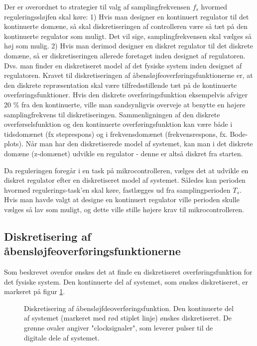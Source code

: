 Der er overordnet to strategier til valg af samplingfrekvensen \(f_s\) hvormed
reguleringssløjfen skal køre:
1) Hvis man designer en kontinuert regulator til det kontinuerte domæne, så
skal diskretiseringen af controlleren være så tæt på den kontinuerte regulator som muligt.
Det vil sige, samplingfrekvensen skal vælges så høj som mulig.
2) Hvis man derimod designer en diskret regulator til det diskrete domæne,
så er diskretiseringen allerede foretaget inden designet af regulatoren.
Dvs. man finder en diskretiseret model af det fysiske system inden designet af regulatoren.
Kravet til diskretiseringen af åbensløjfeoverføringsfunktionerne er, at den diskrete repræsentation
skal være tilfredsstillende tæt på de kontinuerte overføringsfunktioner.
Hvis den diskrete overføringsfunktion eksempelvis afviger 20 \% fra den kontinuerte, ville man
sandsynligvis overveje at benytte en højere samplingfrekvens til diskretiseringen.
Sammenligningen af den diskrete overførselsfunktion og den kontinuerte overføringsfunktion
kan være både i tidsdomænet (fx steprespons) og i frekvensdomænet (frekvensrespons, fx. Bode-plots).
Når man har den diskretiserede model af systemet, kan man i det diskrete domæne (z-domænet)
udvikle en regulator - denne er altså diskret fra starten.

Da reguleringen foregår i en task på mikrocontrolleren, vælges det
at udvikle en diskret regulator efter en diskretiseret model af systemet.
Således kan perioden hvormed regulerings-task'en skal køre, fastlægges ud fra
samplingperioden \(T_s\). Hvis man havde valgt at designe en kontinuert regulator
ville perioden skulle vælges så lav som muligt, og dette ville stille højere krav
til mikrocontrolleren.

\subsection{Diskretisering af åbensløjfeoverføringsfunktionerne}
Som beskrevet ovenfor ønskes det at finde en diskretiseret overføringsfunktion
for det fysiske system. Den kontinuerte del af systemet, som ønskes diskretiseret,
er markeret på figur \ref{fig:digitalkontroller2}.
\begin{figure}[!th]
\centering
\begin{tikzpicture}[auto, node distance=2.6cm,>=latex']

\end{tikzpicture}
\caption[Diskretisering af åbensløjfeoverføringsfunktion]{Diskretisering af åbensløjfdeoverføringsfunktion.
	Den kontinuerte del af systemet (markeret med rød stiplet linje) ønskes diskretiseret.
	De grønne ovaler angiver "clocksignaler", som leverer pulser til de digitale dele af systemet.}
\label{fig:digitalkontroller2}
\end{figure}

